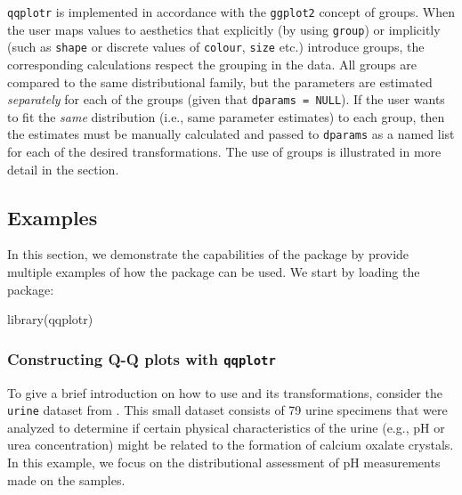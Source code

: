 \texttt{qqplotr} is implemented in accordance with the \texttt{ggplot2}
concept of groups. When the user maps values to aesthetics that
explicitly (by using \texttt{group}) or implicitly (such as
\texttt{shape} or discrete values of \texttt{colour}, \texttt{size}
etc.) introduce groups, the corresponding calculations respect the
grouping in the data. All groups are compared to the same distributional
family, but the parameters are estimated \emph{separately} for each of
the groups (given that \texttt{dparams\ =\ NULL}). If the user wants to
fit the \emph{same} distribution (i.e., same parameter estimates) to
each group, then the estimates must be manually calculated and passed to
\texttt{dparams} as a named list for each of the desired 
transformations. The use of groups is illustrated in more detail in the
 section.

\FloatBarrier

\subsection{Examples}\label{examples}

\label{sec:examples}

In this section, we demonstrate the capabilities of the 
package by provide multiple examples of how the package can be used. We
start by loading the package:

\begin{Schunk}
\begin{Sinput}
library(qqplotr)
\end{Sinput}
\end{Schunk}

\subsubsection{\texorpdfstring{Constructing Q-Q plots with
\texttt{qqplotr}}{Constructing Q-Q plots with qqplotr}}\label{constructing-q-q-plots-with-qqplotr}

To give a brief introduction on how to use  and its
transformations, consider the \texttt{urine} dataset from .
This small dataset consists of 79 urine specimens that were analyzed to
determine if certain physical characteristics of the urine (e.g., pH or
urea concentration) might be related to the formation of calcium oxalate
crystals. In this example, we focus on the distributional assessment of
pH measurements made on the samples.

